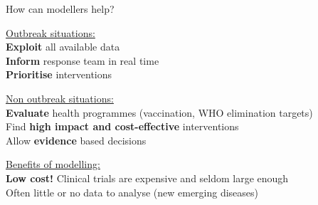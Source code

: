 \documentclass[table,notes]{beamer}\usepackage[]{graphicx}\usepackage[]{color}
\begin{document}
\begin{frame}[fragile]{How can modellers help?}

\underline{Outbreak situations:} \\
\vspace{0.1cm}
\hspace{0.5cm} \textbf{Exploit} all available data \\
\vspace{0.1cm}
\hspace{0.5cm} \textbf{Inform} response team in real time \\
\vspace{0.1cm}
\hspace{0.5cm} \textbf{Prioritise} interventions \\
\vspace{0.3cm}

\underline{Non outbreak situations:} \\
\vspace{0.1cm}
\hspace{0.5cm} \textbf{Evaluate} health programmes (vaccination, WHO elimination targets) \\ %
\vspace{0.1cm}
\hspace{0.5cm} Find \textbf{high impact and cost-effective} interventions \\
\vspace{0.1cm}
\hspace{0.5cm} Allow \textbf{evidence} based decisions \\
\vspace{0.3cm}

\underline{Benefits of modelling:} \\
\vspace{0.1cm}
\hspace{0.5cm} \textbf{Low cost!} Clinical trials are expensive and seldom large enough \\
\vspace{0.1cm}
\hspace{0.5cm} Often little or no data to analyse (new emerging diseases) \\ %
\vspace{0.3cm}



\end{frame}
\end{document}
